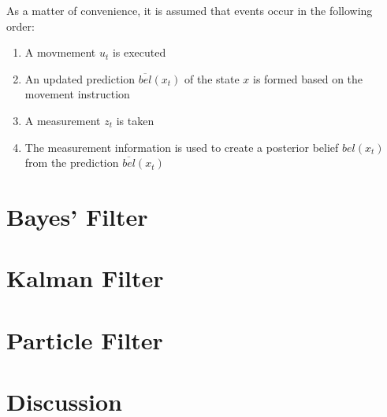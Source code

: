 \documentclass[english]{article}
\begin{document}
As a matter of convenience, it is assumed that events occur in the following order:
\begin{enumerate}
  \item A movmement $u_t$ is executed 
  \item An updated prediction $\overline{bel}(x_t)$ of the state $x$ is formed based on the movement instruction
  \item A measurement $z_t$ is taken
  \item The measurement information is used to create a posterior belief $bel(x_t)$ from the prediction $\overline{bel}(x_t)$
\end{enumerate}



\section*{Bayes' Filter}


\section*{Kalman Filter}


\section*{Particle Filter}


\section*{Discussion}
\end{document}
